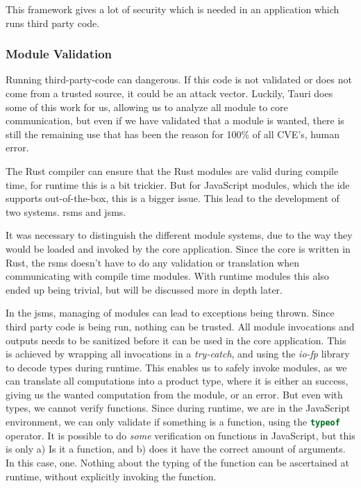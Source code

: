 This framework gives a lot of security which is needed in an
application which runs third party code.

\subsubsection{Module Validation}

Running third-party-code can dangerous. If this code is not validated or does
not come from a trusted source, it could be an attack vector. Luckily, Tauri does
some of this work for us, allowing us to analyze all module to core
communication, but even if we have validated that a module is wanted, there is
still the remaining use that has been the reason for 100\% of all CVE's, human
error.

The Rust compiler can ensure that the Rust modules are valid during compile
time, for runtime this is a bit trickier. But for JavaScript modules, which the
\gls{ide} supports out-of-the-box, this is a bigger issue. This lead to the
development of two systems. \gls{rsms} and \gls{jsms}.

It was necessary to distinguish the different module systems, due to the way
they would be loaded and invoked by the core application. Since the core is
written in Rust, the \gls{rsms} doesn't have to do any validation or
translation when communicating with compile time modules. With runtime modules
this also ended up being trivial, but will be discussed more in depth later.

In the \gls{jsms}, managing of modules can lead to exceptions being thrown.
Since third party code is being run, nothing can be trusted. All module
invocations and outputs needs to be sanitized before it can be used in the core
application. This is achieved by wrapping all invocations in a
\textit{try-catch}, and using the \textit{io-fp} library to decode types during
runtime. This enables us to safely invoke modules, as we can translate all
computations into a product type, where it is either an success, giving us the
wanted computation from the module, or an error. But even with types, we cannot
verify functions. Since during runtime, we are in the JavaScript environment,
we can only validate if something is a function, using the
\lstinline[language=JavaScript]{typeof} operator. It is possible to do
\textit{some} verification on functions in JavaScript, but this is only a) Is it
a function, and b) does it have the correct amount of arguments. In this case,
one. Nothing about the typing of the function can be ascertained at runtime,
without explicitly invoking the function.

